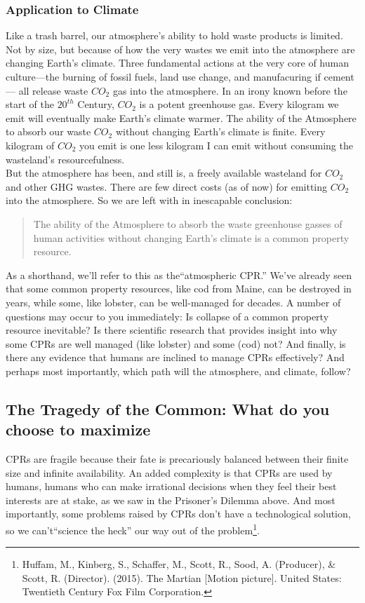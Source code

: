 \documentclass[amstex,12pt]{book}
\begin{document}
\subsubsection{Application to Climate}
Like a trash barrel, our atmosphere's ability to hold waste products is limited. Not by size, but because of how the very wastes we emit into the atmosphere are changing Earth's climate. Three fundamental actions at the very core of human culture---the burning of fossil fuels, land use change, and manufacuring if cement--- all release waste $CO_{2}$ gas into the atmosphere. In an irony known before the start of the $20^{th}$ Century, $CO_{2}$ is a potent greenhouse gas. Every kilogram we emit will eventually make Earth's climate warmer. The ability of the Atmosphere to absorb our waste $CO_{2}$ without changing Earth's climate is finite. Every kilogram of $CO_{2}$ you emit is one less kilogram I can emit without consuming the wasteland's resourcefulness.\\

But the atmosphere has been, and still is, a freely available wasteland for $CO_{2}$ and other GHG wastes. There are few direct costs (as of now) for emitting $CO_{2}$ into the atmosphere. So we are left with in inescapable conclusion:
\begin{quote}
	The ability of the Atmosphere to absorb the waste greenhouse gasses of human activities without changing Earth's climate is a common property resource.
\end{quote}
As a shorthand, we'll refer to this as the``atmospheric CPR.'' We've already seen that some common property resources, like cod from Maine, can be destroyed in years, while some, like lobster, can be well-managed for decades. A number of questions may occur to you immediately: Is collapse of a common property resource inevitable? Is there scientific research that provides insight into why some CPRs are well managed (like lobster) and some (cod) not? And finally, is there any evidence that humans are inclined to manage CPRs effectively? And perhaps most importantly, which path will the atmosphere, and climate, follow?\\
   
\subsection{The Tragedy of the Common: What do you choose to maximize}\label{collective_action}
CPRs are fragile because their fate is precariously balanced between their finite size and infinite availability. An added complexity is that CPRs are used by humans, humans who can make irrational decisions when they feel their best interests are at stake, as we saw in the Prisoner's Dilemma above. And most importantly, some problems raised by CPRs don't have a technological solution, so we can't``science the heck'' our way out of the problem\footnote{Huffam,  M., Kinberg, S., Schaffer, M., Scott, R., Sood, A. (Producer), \& Scott, R. (Director). (2015). The  Martian [Motion picture]. United States:  Twentieth Century Fox Film Corporation.}.\\
 
\end{document}
